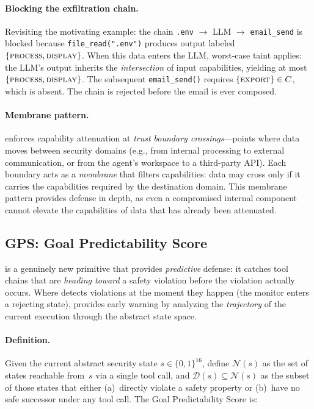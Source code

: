 \paragraph{Blocking the exfiltration chain.} Revisiting the motivating
example: the chain \texttt{.env} $\rightarrow$ LLM $\rightarrow$
\texttt{email\_send} is blocked because \texttt{file\_read(".env")} produces
output labeled $\{\textsc{process}, \textsc{display}\}$. When this data
enters the LLM, worst-case taint applies: the LLM's output inherits the
\emph{intersection} of input capabilities, yielding at most
$\{\textsc{process}, \textsc{display}\}$. The subsequent
\texttt{email\_send()} requires $\{\textsc{export}\} \in C$, which is absent.
The chain is rejected before the email is ever composed.

\paragraph{Membrane pattern.} \cafl enforces capability attenuation at
\emph{trust boundary crossings}---points where data moves between security
domains (e.g., from internal processing to external communication, or from
the agent's workspace to a third-party API). Each boundary acts as a
\emph{membrane} that filters capabilities: data may cross only if it carries
the capabilities required by the destination domain. This membrane pattern
provides defense in depth, as even a compromised internal component cannot
elevate the capabilities of data that has already been attenuated.

\subsection{GPS: Goal Predictability Score}
\label{sec:tcsa:gps}

\gps is a genuinely new primitive that provides \emph{predictive} defense:
it catches tool chains that are \emph{heading toward} a safety violation
before the violation actually occurs. Where \tsa detects violations at the
moment they happen (the monitor enters a rejecting state), \gps provides
early warning by analyzing the \emph{trajectory} of the current execution
through the abstract state space.

\paragraph{Definition.} Given the current abstract security state
$s \in \{0,1\}^{16}$, define $\mathcal{N}(s)$ as the set of states reachable
from~$s$ via a single tool call, and $\mathcal{D}(s) \subseteq \mathcal{N}(s)$
as the subset of those states that either (a)~directly violate a \tsa safety
property or (b)~have no safe successor under any tool call. The Goal
Predictability Score is:

